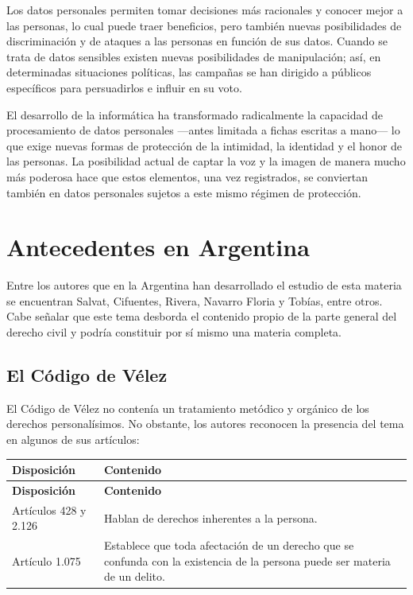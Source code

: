 \documentclass[12pt,oneside]{book}
\begin{document}
Los datos personales permiten tomar decisiones más racionales y conocer mejor a las personas, lo cual puede traer beneficios, pero también nuevas posibilidades de discriminación y de ataques a las personas en función de sus datos. Cuando se trata de datos sensibles existen nuevas posibilidades de manipulación; así, en determinadas situaciones políticas, las campañas se han dirigido a públicos específicos para persuadirlos e influir en su voto.

\begin{important}
El desarrollo de la informática ha transformado radicalmente la capacidad de procesamiento de datos personales —antes limitada a fichas escritas a mano— lo que exige nuevas formas de protección de la intimidad, la identidad y el honor de las personas. La posibilidad actual de captar la voz y la imagen de manera mucho más poderosa hace que estos elementos, una vez registrados, se conviertan también en datos personales sujetos a este mismo régimen de protección.
\end{important}

\section{Antecedentes en Argentina}

Entre los autores que en la Argentina han desarrollado el estudio de esta materia se encuentran Salvat, Cifuentes, Rivera, Navarro Floria y Tobías, entre otros. Cabe señalar que este tema desborda el contenido propio de la parte general del derecho civil y podría constituir por sí mismo una materia completa.


\subsection{El Código de Vélez}

El Código de Vélez no contenía un tratamiento metódico y orgánico de los derechos personalísimos. No obstante, los autores reconocen la presencia del tema en algunos de sus artículos:

\begin{longtable}{p{} p{}}
\toprule
\textbf{Disposición} & \textbf{Contenido} \\
\midrule
\endfirsthead
\toprule
\textbf{Disposición} & \textbf{Contenido} \\
\midrule
\endhead
Artículos 428 y 2.126 & Hablan de derechos inherentes a la persona. \\
\addlinespace
Artículo 1.075 & Establece que toda afectación de un derecho que se confunda con la existencia de la persona puede ser materia de un delito. \\
\bottomrule
\end{longtable}
\end{document}
